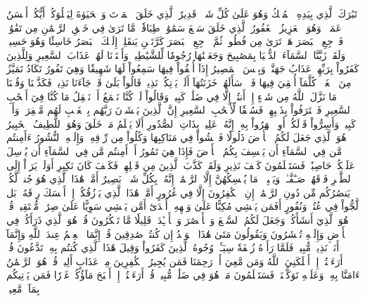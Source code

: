 تَبَٰرَكَ ٱلَّذِي بِيَدِهِ ٱلۡمُلۡكُ وَهُوَ عَلَىٰ كُلِّ شَيۡءٖ قَدِيرٌ
ٱلَّذِي خَلَقَ ٱلۡمَوۡتَ وَٱلۡحَيَوٰةَ لِيَبۡلُوَكُمۡ أَيُّكُمۡ أَحۡسَنُ عَمَلٗاۚ وَهُوَ ٱلۡعَزِيزُ ٱلۡغَفُورُ
ٱلَّذِي خَلَقَ سَبۡعَ سَمَٰوَٰتٖ طِبَاقٗاۖ مَّا تَرَىٰ فِي خَلۡقِ ٱلرَّحۡمَٰنِ مِن تَفَٰوُتٖۖ فَٱرۡجِعِ ٱلۡبَصَرَ هَلۡ تَرَىٰ مِن فُطُورٖ
ثُمَّ ٱرۡجِعِ ٱلۡبَصَرَ كَرَّتَيۡنِ يَنقَلِبۡ إِلَيۡكَ ٱلۡبَصَرُ خَاسِئٗا وَهُوَ حَسِيرٞ
وَلَقَدۡ زَيَّنَّا ٱلسَّمَآءَ ٱلدُّنۡيَا بِمَصَٰبِيحَ وَجَعَلۡنَٰهَا رُجُومٗا لِّلشَّيَٰطِينِۖ وَأَعۡتَدۡنَا لَهُمۡ عَذَابَ ٱلسَّعِيرِ
وَلِلَّذِينَ كَفَرُواْ بِرَبِّهِمۡ عَذَابُ جَهَنَّمَۖ وَبِئۡسَ ٱلۡمَصِيرُ
إِذَآ أُلۡقُواْ فِيهَا سَمِعُواْ لَهَا شَهِيقٗا وَهِيَ تَفُورُ
تَكَادُ تَمَيَّزُ مِنَ ٱلۡغَيۡظِۖ كُلَّمَآ أُلۡقِيَ فِيهَا فَوۡجٞ سَأَلَهُمۡ خَزَنَتُهَآ أَلَمۡ يَأۡتِكُمۡ نَذِيرٞ
قَالُواْ بَلَىٰ قَدۡ جَآءَنَا نَذِيرٞ فَكَذَّبۡنَا وَقُلۡنَا مَا نَزَّلَ ٱللَّهُ مِن شَيۡءٍ إِنۡ أَنتُمۡ إِلَّا فِي ضَلَٰلٖ كَبِيرٖ
وَقَالُواْ لَوۡ كُنَّا نَسۡمَعُ أَوۡ نَعۡقِلُ مَا كُنَّا فِيٓ أَصۡحَٰبِ ٱلسَّعِيرِ
فَٱعۡتَرَفُواْ بِذَنۢبِهِمۡ فَسُحۡقٗا لِّأَصۡحَٰبِ ٱلسَّعِيرِ
إِنَّ ٱلَّذِينَ يَخۡشَوۡنَ رَبَّهُم بِٱلۡغَيۡبِ لَهُم مَّغۡفِرَةٞ وَأَجۡرٞ كَبِيرٞ
وَأَسِرُّواْ قَوۡلَكُمۡ أَوِ ٱجۡهَرُواْ بِهِۦٓۖ إِنَّهُۥ عَلِيمُۢ بِذَاتِ ٱلصُّدُورِ
أَلَا يَعۡلَمُ مَنۡ خَلَقَ وَهُوَ ٱللَّطِيفُ ٱلۡخَبِيرُ
هُوَ ٱلَّذِي جَعَلَ لَكُمُ ٱلۡأَرۡضَ ذَلُولٗا فَٱمۡشُواْ فِي مَنَاكِبِهَا وَكُلُواْ مِن رِّزۡقِهِۦۖ وَإِلَيۡهِ ٱلنُّشُورُ
ءَأَمِنتُم مَّن فِي ٱلسَّمَآءِ أَن يَخۡسِفَ بِكُمُ ٱلۡأَرۡضَ فَإِذَا هِيَ تَمُورُ
أَمۡ أَمِنتُم مَّن فِي ٱلسَّمَآءِ أَن يُرۡسِلَ عَلَيۡكُمۡ حَاصِبٗاۖ فَسَتَعۡلَمُونَ كَيۡفَ نَذِيرِ
وَلَقَدۡ كَذَّبَ ٱلَّذِينَ مِن قَبۡلِهِمۡ فَكَيۡفَ كَانَ نَكِيرِ
أَوَلَمۡ يَرَوۡاْ إِلَى ٱلطَّيۡرِ فَوۡقَهُمۡ صَـٰٓفَّـٰتٖ وَيَقۡبِضۡنَۚ مَا يُمۡسِكُهُنَّ إِلَّا ٱلرَّحۡمَٰنُۚ إِنَّهُۥ بِكُلِّ شَيۡءِۭ بَصِيرٌ
أَمَّنۡ هَٰذَا ٱلَّذِي هُوَ جُندٞ لَّكُمۡ يَنصُرُكُم مِّن دُونِ ٱلرَّحۡمَٰنِۚ إِنِ ٱلۡكَٰفِرُونَ إِلَّا فِي غُرُورٍ
أَمَّنۡ هَٰذَا ٱلَّذِي يَرۡزُقُكُمۡ إِنۡ أَمۡسَكَ رِزۡقَهُۥۚ بَل لَّجُّواْ فِي عُتُوّٖ وَنُفُورٍ
أَفَمَن يَمۡشِي مُكِبًّا عَلَىٰ وَجۡهِهِۦٓ أَهۡدَىٰٓ أَمَّن يَمۡشِي سَوِيًّا عَلَىٰ صِرَٰطٖ مُّسۡتَقِيمٖ
قُلۡ هُوَ ٱلَّذِيٓ أَنشَأَكُمۡ وَجَعَلَ لَكُمُ ٱلسَّمۡعَ وَٱلۡأَبۡصَٰرَ وَٱلۡأَفۡـِٔدَةَۚ قَلِيلٗا مَّا تَشۡكُرُونَ
قُلۡ هُوَ ٱلَّذِي ذَرَأَكُمۡ فِي ٱلۡأَرۡضِ وَإِلَيۡهِ تُحۡشَرُونَ
وَيَقُولُونَ مَتَىٰ هَٰذَا ٱلۡوَعۡدُ إِن كُنتُمۡ صَٰدِقِينَ
قُلۡ إِنَّمَا ٱلۡعِلۡمُ عِندَ ٱللَّهِ وَإِنَّمَآ أَنَا۠ نَذِيرٞ مُّبِينٞ
فَلَمَّا رَأَوۡهُ زُلۡفَةٗ سِيٓـَٔتۡ وُجُوهُ ٱلَّذِينَ كَفَرُواْ وَقِيلَ هَٰذَا ٱلَّذِي كُنتُم بِهِۦ تَدَّعُونَ
قُلۡ أَرَءَيۡتُمۡ إِنۡ أَهۡلَكَنِيَ ٱللَّهُ وَمَن مَّعِيَ أَوۡ رَحِمَنَا فَمَن يُجِيرُ ٱلۡكَٰفِرِينَ مِنۡ عَذَابٍ أَلِيمٖ
قُلۡ هُوَ ٱلرَّحۡمَٰنُ ءَامَنَّا بِهِۦ وَعَلَيۡهِ تَوَكَّلۡنَاۖ فَسَتَعۡلَمُونَ مَنۡ هُوَ فِي ضَلَٰلٖ مُّبِينٖ
قُلۡ أَرَءَيۡتُمۡ إِنۡ أَصۡبَحَ مَآؤُكُمۡ غَوۡرٗا فَمَن يَأۡتِيكُم بِمَآءٖ مَّعِينِۭ
